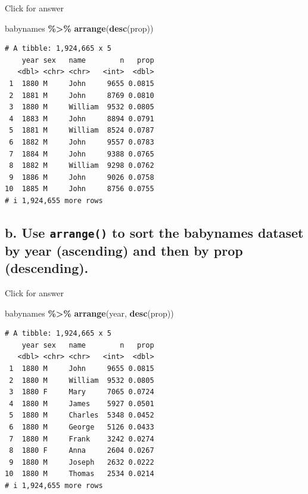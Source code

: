 \documentclass[
]{book}
\newenvironment{Shaded}{\begin{snugshade}}{\end{snugshade}}
\newcommand{\FunctionTok}[1]{\textcolor[rgb]{0.13,0.29,0.53}{\textbf{#1}}}
\newcommand{\NormalTok}[1]{#1}
\newcommand{\SpecialCharTok}[1]{\textcolor[rgb]{0.81,0.36,0.00}{\textbf{#1}}}
\begin{document}
Click for answer

\begin{Shaded}
\begin{Highlighting}[]
\NormalTok{babynames }\SpecialCharTok{\%\textgreater{}\%} \FunctionTok{arrange}\NormalTok{(}\FunctionTok{desc}\NormalTok{(prop))}
\end{Highlighting}
\end{Shaded}

\begin{verbatim}
# A tibble: 1,924,665 x 5
    year sex   name        n   prop
   <dbl> <chr> <chr>   <int>  <dbl>
 1  1880 M     John     9655 0.0815
 2  1881 M     John     8769 0.0810
 3  1880 M     William  9532 0.0805
 4  1883 M     John     8894 0.0791
 5  1881 M     William  8524 0.0787
 6  1882 M     John     9557 0.0783
 7  1884 M     John     9388 0.0765
 8  1882 M     William  9298 0.0762
 9  1886 M     John     9026 0.0758
10  1885 M     John     8756 0.0755
# i 1,924,655 more rows
\end{verbatim}

\hypertarget{b.-use-arrange-to-sort-the-babynames-dataset-by-year-ascending-and-then-by-prop-descending.}{%
\subsection{\texorpdfstring{b. Use \texttt{arrange()} to sort the babynames dataset by year (ascending) and then by prop (descending).}{b. Use arrange() to sort the babynames dataset by year (ascending) and then by prop (descending).}}\label{b.-use-arrange-to-sort-the-babynames-dataset-by-year-ascending-and-then-by-prop-descending.}}

Click for answer

\begin{Shaded}
\begin{Highlighting}[]
\NormalTok{babynames }\SpecialCharTok{\%\textgreater{}\%} \FunctionTok{arrange}\NormalTok{(year, }\FunctionTok{desc}\NormalTok{(prop))}
\end{Highlighting}
\end{Shaded}

\begin{verbatim}
# A tibble: 1,924,665 x 5
    year sex   name        n   prop
   <dbl> <chr> <chr>   <int>  <dbl>
 1  1880 M     John     9655 0.0815
 2  1880 M     William  9532 0.0805
 3  1880 F     Mary     7065 0.0724
 4  1880 M     James    5927 0.0501
 5  1880 M     Charles  5348 0.0452
 6  1880 M     George   5126 0.0433
 7  1880 M     Frank    3242 0.0274
 8  1880 F     Anna     2604 0.0267
 9  1880 M     Joseph   2632 0.0222
10  1880 M     Thomas   2534 0.0214
# i 1,924,655 more rows
\end{verbatim}
\end{document}
